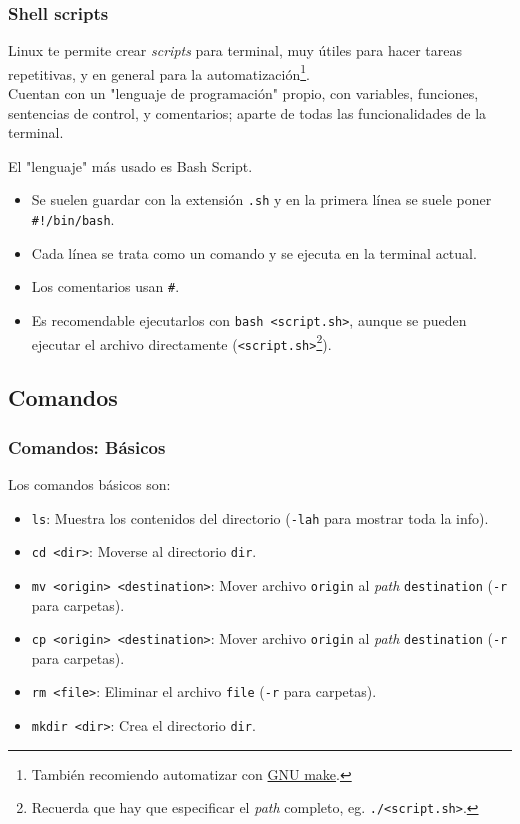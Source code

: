 \documentclass[aspectratio=43]{beamer}
\begin{document}
\begin{frame}
    \frametitle{Shell scripts}
    
    Linux te permite crear \textit{scripts} para terminal, muy útiles para hacer tareas repetitivas, y en general para la automatización\footnote{También recomiendo automatizar con \href{https://www.gnu.org/software/make/manual/make.html}{GNU make}.}.\\
    Cuentan con un "lenguaje de programación" propio, con variables, funciones, sentencias de control, y comentarios; aparte de todas las funcionalidades de la terminal.\newline

    El "lenguaje" más usado es Bash Script.
    \begin{itemize}
        \item Se suelen guardar con la extensión \texttt{.sh} y en la primera línea se suele poner \texttt{\#!/bin/bash}.
        \item Cada línea se trata como un comando y se ejecuta en la terminal actual.
        \item Los comentarios usan \texttt{\#}.
        \item Es recomendable ejecutarlos con \texttt{bash <script.sh>}, aunque se pueden ejecutar el archivo directamente (\texttt{<script.sh>}\footnote{Recuerda que hay que especificar el \textit{path} completo, eg. \texttt{./<script.sh>}.}).
    \end{itemize}

\end{frame}


\subsection{Comandos}

\begin{frame}
    \frametitle{Comandos: Básicos}
    Los comandos básicos son:

    \begin{itemize}
        \item \texttt{ls}: Muestra los contenidos del directorio (\texttt{-lah} para mostrar toda la info).
        \item \texttt{cd <dir>}: Moverse al directorio \texttt{dir}.
        \item \texttt{mv <origin> <destination>}: Mover archivo \texttt{origin} al \textit{path} \texttt{destination} (\texttt{-r} para carpetas).
        \item \texttt{cp <origin> <destination>}: Mover archivo \texttt{origin} al \textit{path} \texttt{destination} (\texttt{-r} para carpetas).
        \item \texttt{rm <file>}: Eliminar el archivo \texttt{file} (\texttt{-r} para carpetas).
        \item \texttt{mkdir <dir>}: Crea el directorio \texttt{dir}.
    \end{itemize}
\end{frame}
\end{document}
